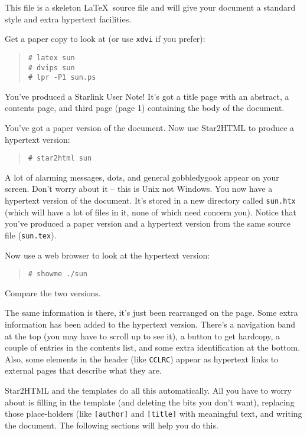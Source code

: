\documentclass[twoside,11pt]{article}
\renewcommand{\_}{\texttt{\symbol{95}}}
\begin{document}
This file is a skeleton \LaTeX\ source file and will give your document a
standard style and extra hypertext facilities.

Get a paper copy to look at (or use \texttt{xdvi} if you prefer):

\begin{quote}
\begin{verbatim}
# latex sun
# dvips sun
# lpr -P1 sun.ps
\end{verbatim}
\end{quote}

You've produced a Starlink User Note!
It's got a title page with an abstract, a contents page, and third page
(page 1) containing the body of the document.

You've got a paper version of the document.
Now use Star2HTML to produce a hypertext version:

\begin{quote}
\begin{verbatim}
# star2html sun
\end{verbatim}
\end{quote}

A lot of alarming messages, dots, and general gobbledygook appear on your
screen.
Don't worry about it -- this is Unix not Windows.
You now have a hypertext version of the document.
It's stored in a new directory called \texttt{sun.htx} (which will
have a lot of files in it, none of which need concern you).
Notice that you've produced a paper version and a hypertext version from the
same source file (\texttt{sun.tex}).

Now use a web browser to look at the hypertext version:

\begin{quote}
\begin{verbatim}
# showme ./sun
\end{verbatim}
\end{quote}

Compare the two versions.

The same information is there, it's just been rearranged on the page.
Some extra information has been added to the hypertext version.
There's a navigation band at the top (you may have to scroll up to see it), a
button to get hardcopy, a couple of entries in the contents list, and some
extra identification at the bottom.
Also, some elements in the header (like \texttt{CCLRC}) appear as hypertext
links to external pages that describe what they are.

Star2HTML and the templates do all this automatically.
All you have to worry about is filling in the template (and deleting the
bits you don't want), replacing those place-holders (like \texttt{[author]} and
\texttt{[title]} with meaningful text, and writing the document.
The following sections will help you do this.
\end{document}
